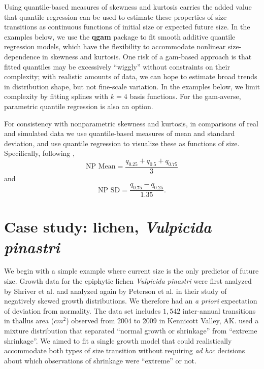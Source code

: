 \documentclass[12pt]{article}
\newcounter{box}
\newcommand{\be}{\begin{equation}}
\newcommand{\ee}{\end{equation}}
\begin{document}
Using quantile-based measures of skewness and kurtosis carries the added value that quantile regression can be used to estimate these properties of size transitions as continuous functions of initial size or expected future size. 
In the examples below, we use the \textbf{qgam} package \citep{fasiolo2020qgam} to fit smooth additive quantile regression models, which have the flexibility to accommodate nonlinear size-dependence in skewness and kurtosis. 
One risk of a gam-based approach is that fitted quantiles may be excessively ``wiggly'' without constraints on their complexity; with realistic amounts of data, we can hope to estimate broad trends in distribution shape, but not fine-scale variation.  
In the examples below, we limit complexity by fitting splines with $k=4$ basis functions. 
For the gam-averse, parametric quantile regression is also an option. 

For consistency with nonparametric skewness and kurtosis, in comparisons of real and simulated data we use quantile-based measures of mean and standard deviation, and use quantile regression to visualize these as functions of size. 
Specifically, following \cite{wan2014estimating},
\be
\mbox{NP Mean}  = \frac{q_{0.25} + q_{0.5} + q_{0.75}}{3}
\label{eqn:NPmean}
\ee
and
\be
\mbox{NP SD}  = \frac{q_{0.75} - q_{0.25}}{1.35}.
\label{eqn:NPsd}
\ee

\section{Case study: lichen, \emph{Vulpicida pinastri}}
\label{sec:lichenCaseStudy} 
We begin with a simple example where current size is the only predictor of future size. 
Growth data for the epiphytic lichen \emph{Vulpicida pinastri} were first analyzed by Shriver et al. \citeyear{shriver2012comparative} and analyzed again by Peterson et al. \citeyear{peterson2019improving} in their study of negatively skewed growth distributions. 
We therefore had an \emph{a priori} expectation of deviation from normality. 
The data set includes $1,542$ inter-annual transitions in thallus area ($cm^2$) observed from 2004 to 2009 in Kennicott Valley, AK. 
\citeyear{shriver2012comparative} used a mixture distribution that separated ``normal growth or shrinkage'' from ``extreme shrinkage''. 
We aimed to fit a single growth model that could realistically accommodate both types of size transition without requiring \emph{ad hoc} decisions about which observations of shrinkage were ``extreme'' or not.
\end{document}
